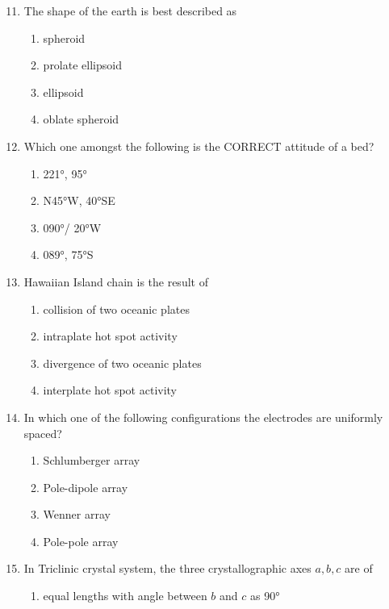 \documentclass[journal,12pt,onecolumn]{IEEEtran}
\theoremstyle{remark}
\begin{document}
\begin{enumerate}
\setcounter{enumi}{10}

\item The shape of the earth is best described as  
\begin{multicols}{2}
\begin{enumerate}
\item spheroid  
\item prolate ellipsoid  
\item ellipsoid  
\item oblate spheroid  
\end{enumerate}
\end{multicols}

\item Which one amongst the following is the CORRECT attitude of a bed?  
\begin{multicols}{4}
\begin{enumerate}
\item 221°, 95°  
\item N45°W, 40°SE  
\item 090°/ 20°W  
\item 089°, 75°S  
\end{enumerate}
\end{multicols}

\item Hawaiian Island chain is the result of  
\begin{enumerate}
\item collision of two oceanic plates  
\item intraplate hot spot activity  
\item divergence of two oceanic plates  
\item interplate hot spot activity  
\end{enumerate}

\item In which one of the following configurations the electrodes are uniformly spaced?  
\begin{enumerate}
\item Schlumberger array  
\item Pole-dipole array  
\item Wenner array  
\item Pole-pole array  
\end{enumerate}

\item In Triclinic crystal system, the three crystallographic axes \(a, b, c\) are of  
\begin{enumerate}
\item equal lengths with angle between \(b\) and \(c\) as 90°  


\end{enumerate}
\end{enumerate}
\end{document}
